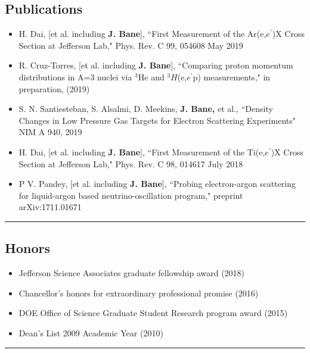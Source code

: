 \subsection*{Publications}
\begin{itemize} \itemsep -2pt %
\item  H. Dai, [et al. including \textbf{J. Bane}], ``First Measurement of the Ar(e,$e^\prime$)X Cross Section at Jefferson Lab," Phys. Rev. C 99, 054608 May 2019
\item R. Cruz-Torres, [et al. including \textbf{J. Bane}], ``Comparing proton momentum distributions in A=3 nuclei via $^3$He and $^3H$(e,$e^\prime$p) measurements," in preparation, (2019)
\item S. N. Santiesteban, S. Alsalmi, D. Meekins, \textbf{J. Bane,} et al., ``Density Changes in Low Pressure Gas Targets for Electron Scattering Experiments" NIM A 940, 2019
\item  H. Dai, [et al. including \textbf{J. Bane}], ``First Measurement of the Ti(e,$e^\prime$)X Cross Section at Jefferson Lab," Phys. Rev. C 98, 014617 July 2018
\item P V. Pandey, [et al. including \textbf{J. Bane}], ``Probing electron-argon scattering for liquid-argon based neutrino-oscillation program," preprint arXiv:1711.01671

\end{itemize}
\hrule
\subsection*{Honors}
\begin{itemize}
\item Jefferson Science Associates graduate fellowship award (2018)  
\item Chancellor’s honors for extraordinary professional promise (2016) 
\item DOE Office of Science Graduate Student Research program award (2015)
\item Dean's List 2009 Academic Year (2010)
\end{itemize}
\hrule
